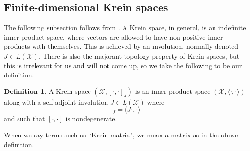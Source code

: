 \documentclass{amsart}
\numberwithin{equation}{section}
\theoremstyle{definition}
\newtheorem{definition}[theorem]{Definition}
\theoremstyle{plain}
\theoremstyle{solutionstyle}
\begin{document}
\subsection{Finite-dimensional Krein spaces}
The following subsection follows from \cite{franco2026conejhermitianmatricesgeometric}
. A Krein space, in general, is an indefinite inner-product space, where vectors are allowed to have non-positive inner-products with themselves. This is achieved by an involution, normally denoted $J\in L(\mathcal{X})$. There is also the majorant topology property of Krein spaces, but this is irrelevant for us and will not come up, so we take the following to be our definition. 
\begin{definition}\cite{franco2026conejhermitianmatricesgeometric}
A Krein space $(\mathcal{X},[\cdot,\cdot]_J)$ is an inner-product space $(\mathcal{X},\langle\cdot,\cdot\rangle)$ along with a self-adjoint involution $J\in L(\mathcal{X})$ where \begin{equation*}[\cdot,\cdot]_J=\langle J \cdot,\cdot\rangle\end{equation*} and such that $[\cdot,\cdot]$ is nondegenerate. 
\end{definition}

When we say terms such as ``Krein matrix", we mean a matrix as in the above definition.
\end{document}
